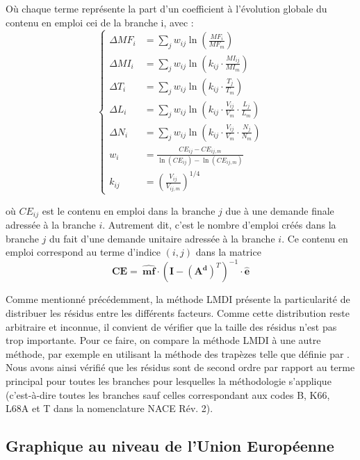 Où chaque terme représente la part d’un coefficient à l’évolution globale du contenu en emploi cei de la branche i, avec :
\begin{equation}
\renewcommand*{\arraystretch}{2}
	\left\{
	\begin{array}{ll}
	\Delta MF_i &= \sum_j w_{ij} \ln(\frac{MF_i}{MF_m}) \\
	\Delta MI_i &= \sum_j w_{ij} \ln( k_{ij} \cdot \frac{MI_{ij}}{MI_m}) \\
	\Delta T_i &= \sum_j w_{ij} \ln( k_{ij} \cdot \frac{T_j}{T_m}) \\
	\Delta L_i &= \sum_j w_{ij} \ln( k_{ij} \cdot \frac{V_{ij}}{V_m} \cdot \frac{L_j}{L_m}) \\
	\Delta N_i &= \sum_j w_{ij} \ln( k_{ij} \cdot \frac{V_{ij}}{V_m} \cdot \frac{N_j}{N_m}) \\
	w_i &= \frac{CE_{ij} - CE_{ij,m}}{\ln(CE_{ij}) - \ln(CE_{ij,m})} \\
	k_{ij} &= \left(\frac{V_{ij}}{V_{ij,m}} \right)^{1/4}
	\end{array}
	\right.
\end{equation}


où $CE_{ij}$ est le contenu en emploi dans la branche $j$ due à une demande finale adressée à la branche $i$. Autrement dit, c'est le nombre d'emploi créés dans la branche $j$ du fait d'une demande unitaire adressée à la branche $i$. Ce contenu en emploi correspond au terme d'indice $(i,j)$ dans la matrice $$\pmb{CE} =~\widehat{\pmb{mf}} \cdot (\pmb{I} - (\pmb{A^d})^T)^{-1} \cdot \widehat{\pmb{e}}$$

Comme mentionné précédemment, la méthode LMDI présente la particularité de distribuer les résidus entre les différents facteurs. Comme cette distribution reste arbitraire et inconnue, il convient de vérifier que la taille des résidus n’est pas trop importante. Pour ce faire, on compare la méthode LMDI à une autre méthode, par exemple en utilisant la méthode des trapèzes telle que définie par \citet{Muller}. Nous avons ainsi vérifié que les résidus sont de second ordre par rapport au terme principal pour toutes les branches pour lesquelles la méthodologie s’applique (c’est-à-dire toutes les branches sauf celles correspondant aux codes B, K66, L68A et T dans la nomenclature NACE Rév. 2).


\cleardoublepage
\subsection{Graphique au niveau de l'Union Européenne}
\label{app:ges_emploi_EU}

